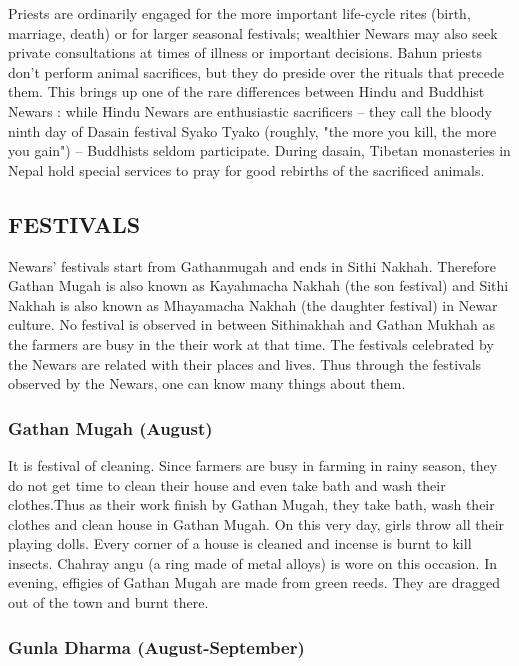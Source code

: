 \documentclass[a4paper,13pt, margin=0.9in]{article}
\begin{document}
\begin{flushleft}
	Priests are ordinarily engaged for the more important life-cycle rites (birth, marriage, death) or for larger seasonal festivals; wealthier Newars may also seek private consultations at times of illness or important decisions. Bahun priests don't perform animal sacrifices, but they do preside over the rituals that precede them. This brings up one of the rare differences between Hindu and Buddhist Newars : while Hindu Newars are enthusiastic sacrificers – they call the bloody ninth day of Dasain festival Syako Tyako (roughly, "the more you kill, the more you gain") – Buddhists seldom participate. During dasain, Tibetan monasteries in Nepal hold special services to pray for good rebirths of the sacrificed animals.\\


	\newpage
	\subsection{FESTIVALS}
	Newars' festivals start from Gathanmugah and ends in Sithi Nakhah. Therefore Gathan Mugah is also known as Kayahmacha Nakhah (the son festival) and Sithi Nakhah is also known as Mhayamacha Nakhah (the daughter festival) in Newar culture. No festival is observed in between Sithinakhah and Gathan Mukhah as the farmers are busy in the their work at that time. The festivals celebrated by the Newars are related with their places and lives. Thus through the festivals observed by the Newars, one can know many things about them.

	\subsubsection{Gathan Mugah (August)}

	It is festival of cleaning. Since farmers are busy in farming in rainy season, they do not get time to clean their house and even take bath and wash their clothes.Thus as their work finish by Gathan Mugah, they take bath, wash their clothes and clean house in Gathan Mugah. On this very day, girls throw all their playing dolls. Every corner of a house is cleaned and incense is burnt to kill insects. Chahray angu (a ring made of metal alloys) is wore on this occasion. In evening, effigies of Gathan Mugah are made from green reeds. They are dragged out of the town and burnt there.

	\subsubsection{Gunla Dharma (August-September)}


\end{flushleft}
\end{document}
